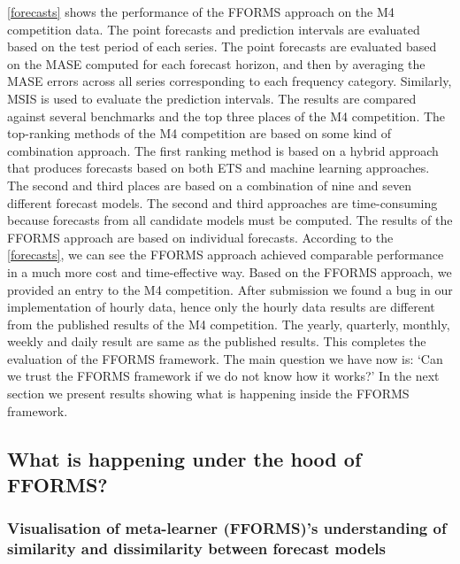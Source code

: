\documentclass[11pt,a4paper,]{article}
\begin{document}
\autoref{forecasts} shows the performance of the FFORMS approach on the M4 competition data. The point forecasts and prediction intervals are evaluated based on the test period of each series. The point forecasts are evaluated based on the MASE computed for each forecast horizon, and then by averaging the MASE errors across all series corresponding to each frequency category. Similarly, MSIS is used to evaluate the prediction intervals. The results are compared against several benchmarks and the top three places of the M4 competition. The top-ranking methods of the M4 competition are based on some kind of combination approach. The first ranking method is based on a hybrid approach that produces forecasts based on both ETS and machine learning approaches. The second and third places are based on a combination of nine and seven different forecast models. The second and third approaches are time-consuming because forecasts from all candidate models must be computed. The results of the FFORMS approach are based on individual forecasts. According to the \autoref{forecasts}, we can see the FFORMS approach achieved comparable performance in a much more cost and time-effective way. Based on the FFORMS approach, we provided an entry to the M4 competition. After submission we found a bug in our implementation of hourly data, hence only the hourly data results are different from the published results of the M4 competition. The yearly, quarterly, monthly, weekly and daily result are same as the published results. This completes the evaluation of the FFORMS framework. The main question we have now is: `Can we trust the FFORMS framework if we do not know how it works?' In the next section we present results showing what is happening inside the FFORMS framework.

\hypertarget{what-is-happening-under-the-hood-of-fforms}{%
\subsection{What is happening under the hood of FFORMS?}\label{what-is-happening-under-the-hood-of-fforms}}

\hypertarget{visualisation-of-meta-learner-fformss-understanding-of-similarity-and-dissimilarity-between-forecast-models}{%
\subsubsection{Visualisation of meta-learner (FFORMS)'s understanding of similarity and dissimilarity between forecast models}\label{visualisation-of-meta-learner-fformss-understanding-of-similarity-and-dissimilarity-between-forecast-models}}
\end{document}
